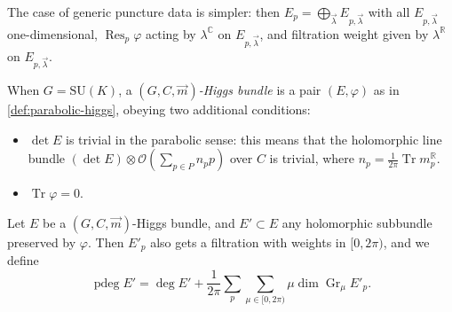 \documentclass[12pt,letterpaper,reqno]{article}
\numberwithin{equation}{section}
\newcommand{\cO}{\ensuremath{\mathcal O}}
\newcommand{\R}{\ensuremath{\mathbb R}}
\newcommand{\C}{\ensuremath{\mathbb C}}
\newcommand{\de}{\mathrm{d}}
\newcommand{\ti}[1]{\textit{#1}}
\DeclareMathOperator{\Tr}{Tr}
\DeclareMathOperator{\Res}{Res}
\DeclareMathOperator{\pdeg}{pdeg}
\DeclareMathOperator{\Gr}{Gr}
\newcommand{\SU}{\mathrm{SU}}
\begin{document}

\begin{remark}
The case of generic puncture data is simpler:
then $E_p = \bigoplus_{\vec\lambda} E_{p,\vec\lambda}$
with all $E_{p,\vec\lambda}$ one-dimensional, $\Res_p \varphi$ 
acting by $\lambda^\C$ on $E_{p,\vec\lambda}$, and filtration weight given by $\lambda^\R$ on $E_{p,\vec\lambda}$.
\end{remark}


\begin{defn}[Parabolic Higgs bundles for $G = \SU(K)$]
When $G = \SU(K)$, a \ti{$(G,C,\vec m)$-Higgs bundle} 
is a pair $(E, \varphi)$ as in \autoref{def:parabolic-higgs}, 
obeying two additional conditions:
\begin{itemize} 
\item $\det E$ is trivial in the parabolic sense: this means
that the holomorphic line bundle $(\det E) \otimes \cO\left(\sum_{p \in P} n_p p\right)$ over $C$ is trivial, where $n_p = \frac{1}{2\pi}\Tr m_p^\R$.
\item $\Tr \varphi = 0$.
\end{itemize}
\end{defn}

\begin{defn}
Let $E$ be a $(G, C, \vec m)$-Higgs bundle,
and $E' \subset E$ any holomorphic subbundle preserved by
$\varphi$. Then $E'_p$ also gets a filtration with
weights in $[0,2\pi)$, and we define
\begin{equation} \label{eq:pdeg}
  \pdeg E' = \deg E' + \frac{1}{2\pi} \sum_p \sum_{\mu \in [0,2\pi)} \mu \dim \Gr_\mu E'_p.
\end{equation}
\end{defn}
\end{document}
